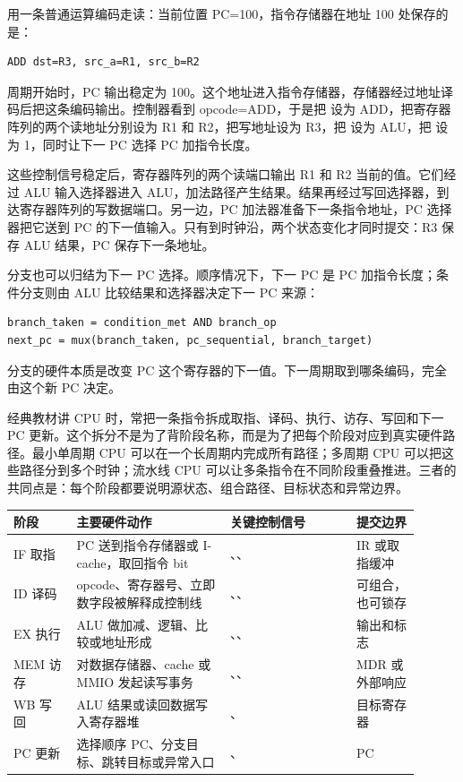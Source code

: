 用一条普通运算编码走读：当前位置 PC=100，指令存储器在地址 100 处保存的是：

\begin{lstlisting}
ADD dst=R3, src_a=R1, src_b=R2
\end{lstlisting}

周期开始时，PC 输出稳定为 100。这个地址进入指令存储器，存储器经过地址译码后把这条编码输出。控制器看到 opcode=ADD，于是把  设为 ADD，把寄存器阵列的两个读地址分别设为 R1 和 R2，把写地址设为 R3，把  设为 ALU，把  设为 1，同时让下一 PC 选择 PC 加指令长度。

这些控制信号稳定后，寄存器阵列的两个读端口输出 R1 和 R2 当前的值。它们经过 ALU 输入选择器进入 ALU，加法路径产生结果。结果再经过写回选择器，到达寄存器阵列的写数据端口。另一边，PC 加法器准备下一条指令地址，PC 选择器把它送到 PC 的下一值输入。只有到时钟沿，两个状态变化才同时提交：R3 保存 ALU 结果，PC 保存下一条地址。

分支也可以归结为下一 PC 选择。顺序情况下，下一 PC 是 PC 加指令长度；条件分支则由 ALU 比较结果和选择器决定下一 PC 来源：

\begin{lstlisting}
branch_taken = condition_met AND branch_op
next_pc = mux(branch_taken, pc_sequential, branch_target)
\end{lstlisting}

分支的硬件本质是改变 PC 这个寄存器的下一值。下一周期取到哪条编码，完全由这个新 PC 决定。

经典教材讲 CPU 时，常把一条指令拆成取指、译码、执行、访存、写回和下一 PC 更新。这个拆分不是为了背阶段名称，而是为了把每个阶段对应到真实硬件路径。最小单周期 CPU 可以在一个长周期内完成所有路径；多周期 CPU 可以把这些路径分到多个时钟；流水线 CPU 可以让多条指令在不同阶段重叠推进。三者的共同点是：每个阶段都要说明源状态、组合路径、目标状态和异常边界。

\begin{longtable}{L{0.14\linewidth}L{0.34\linewidth}L{0.28\linewidth}L{0.14\linewidth}}
\toprule
阶段 & 主要硬件动作 & 关键控制信号 & 提交边界 \\
\midrule
IF 取指 & PC 送到指令存储器或 I-cache，取回指令 bit & 、、 & IR 或取指缓冲 \\
ID 译码 & opcode、寄存器号、立即数字段被解释成控制线 & 、、 & 可组合，也可锁存 \\
EX 执行 & ALU 做加减、逻辑、比较或地址形成 & 、、 & 输出和标志 \\
MEM 访存 & 对数据存储器、cache 或 MMIO 发起读写事务 & 、、 & MDR 或外部响应 \\
WB 写回 & ALU 结果或读回数据写入寄存器堆 & 、 & 目标寄存器 \\
PC 更新 & 选择顺序 PC、分支目标、跳转目标或异常入口 & 、 & PC \\
\bottomrule
\end{longtable}

